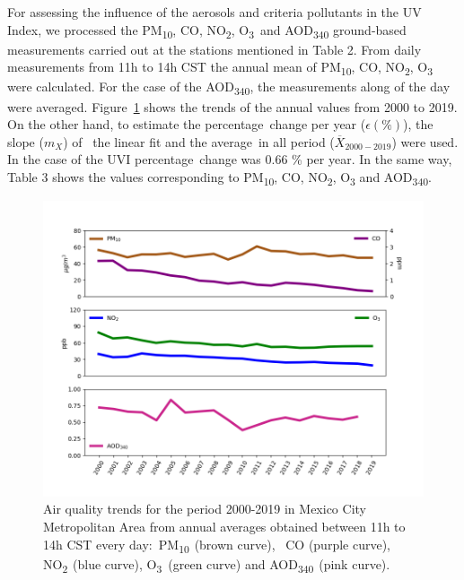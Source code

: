 \documentclass[10pt]{article}
\begin{document}
For assessing the influence of the aerosols and criteria pollutants in
the UV Index, we processed the PM\textsubscript{10}, CO,
NO\textsubscript{2}, O\textsubscript{3}~and AOD\textsubscript{340}
ground-based measurements carried out at the stations mentioned in Table
2. From daily measurements from 11h to 14h CST the annual mean of
PM\textsubscript{10}, CO, NO\textsubscript{2}, O\textsubscript{3} were
calculated. For the case of the AOD\textsubscript{340}, the measurements
along of the day were averaged. Figure~{\ref{610674}}{
shows the trends of the annual values from 2000 to 2019. On the other
hand, to estimate the percentage~change per year (}\(\epsilon\left(\%\right)\)),
the slope (\(m_ {X}\)) of~ the linear fit and the average~in all
period (\(\overline{X}_{2000-2019}\)) were used. In the case of the UVI
percentage~change was 0.66 \% per year. In the same way, Table 3 shows
the values corresponding to PM\textsubscript{10}, CO,
NO\textsubscript{2}, O\textsubscript{3} and AOD\textsubscript{340}.~
\begin{figure}[H]
\begin{center}
\includegraphics[width=0.56\columnwidth]{figures/contCDMX}
\caption{{Air quality trends for the period 2000-2019 in Mexico City Metropolitan
Area from annual averages obtained between 11h to 14h CST every
day:~PM\textsubscript{10~}(brown curve),~ CO (purple curve),
NO\textsubscript{2~}(blue curve), O\textsubscript{3}~(green curve) and
AOD\textsubscript{340~}(pink curve).
{\label{610674}}%
}}
\end{center}
\end{figure}
\end{document}
